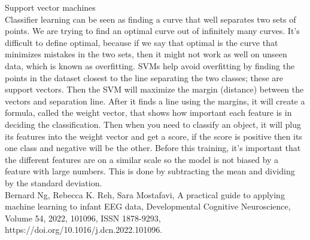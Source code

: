 \documentclass{article}
\begin{document}
Support vector machines\\
Classifier learning can be seen as finding a curve that well separates two sets of points. We are trying to find an optimal curve out of infinitely many curves. It’s difficult to define optimal, because if we say that optimal is the curve that minimizes mistakes in the two sets, then it might not work as well on unseen data, which is known as overfitting. SVMs help avoid overfitting by finding the points in the dataset closest to the line separating the two classes; these are support vectors. Then the SVM will maximize the margin (distance) between the vectors and separation line. After it finds a line using the margins, it will create a formula, called the weight vector, that shows how important each feature is in deciding the classification. Then when you need to classify an object, it will plug its features into the weight vector and get a score, if the score is positive then its one class and negative will be the other. Before this training, it’s important that the different features are on a similar scale so the model is not biased by a feature with large numbers. This is done by subtracting the mean and dividing by the standard deviation.\\


Bernard Ng, Rebecca K. Reh, Sara Mostafavi, A practical guide to applying machine learning to infant EEG data, Developmental Cognitive Neuroscience, Volume 54,
2022, 101096, ISSN 1878-9293, https://doi.org/10.1016/j.dcn.2022.101096.
\end{document}
